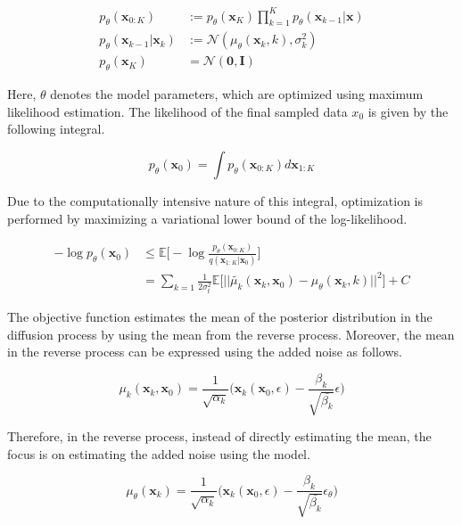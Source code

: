 \documentclass{article}
\begin{document}
\begin{equation}
  \begin{split}
    p_{\theta} (\bm{x}_{0:K}) &:= p_{\theta} (\bm{x}_K) \prod_{k=1}^K p_{\theta} (\bm{x}_{k-1} | \bm{x}) \\
    p_{\theta}(\bm{x}_{k-1} | \bm{x}_k) &:= \mathcal{N} (\mu_{\theta}(\bm{x}_k, k), \sigma_{k}^2) \\
    p_{\theta} (\bm{x}_K) &= \mathcal{N}(\bm{0}, \bm{I})
  \end{split}
\end{equation}

Here, $\theta$ denotes the model parameters, which are optimized using maximum likelihood estimation. The likelihood of the final sampled data $x_0$ is given by the following integral. 

\begin{equation}
  p_{\theta} (\bm{x}_0) = \int p_{\theta} (\bm{x}_{0:K}) d\bm{x}_{1:K}
\end{equation}

Due to the computationally intensive nature of this integral, optimization is performed by maximizing a variational lower bound of the log-likelihood.

\begin{equation}
\label{eq:obj1}
  \begin{split}
    - \log p_{\theta} (\bm{x}_0) &\leq \mathbb{E} \Big[ - \log \frac{p_\theta(\bm{x}_{0:K})}{q(\bm{x}_{1:K}|\bm{x}_{0})} \Big] \\
    &= \sum_{k=1} \frac{1}{2 \sigma_{t}^{2}} \mathbb{E} \Big[ || \tilde{\mu_k} (\bm{x}_k, \bm{x}_0) - \mu_{\theta} (\bm{x}_k, k) ||^2 \Big] + C
  \end{split}
\end{equation}

The objective function estimates the mean of the posterior distribution in the diffusion process by using the mean from the reverse process. Moreover, the mean in the reverse process can be expressed using the added noise as follows. 

\begin{equation}
  \mu_k(\bm{x}_k, \bm{x}_0) = \frac{1}{\sqrt{\alpha_k}} \Big( \bm{x}_k(\bm{x}_0, \epsilon) - \frac{\beta_k}{\sqrt{\bar{\beta_k}}}\epsilon \Big)
\end{equation}

Therefore, in the reverse process, instead of directly estimating the mean, the focus is on estimating the added noise using the model. 

\begin{equation}
\label{eq:mu_kheta}
  \mu_{\theta}(\bm{x}_k) = \frac{1}{\sqrt{\alpha_k}} \Big( \bm{x}_k(\bm{x}_0, \epsilon) - \frac{\beta_k}{\sqrt{\bar{\beta_k}}}\epsilon_{\theta} \Big)
\end{equation}
\end{document}
